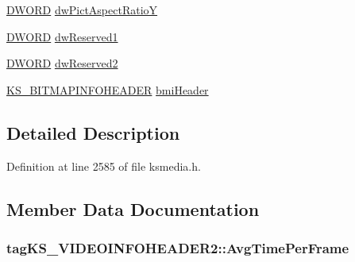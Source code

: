 \begin{DoxyCompactItemize}
\item 
\hyperlink{mapinls_8h_ad342ac907eb044443153a22f964bf0af}{D\+W\+O\+RD} \hyperlink{structtag_k_s___v_i_d_e_o_i_n_f_o_h_e_a_d_e_r2_a4ed8f4665121a30a954bf43a7d15a4b0}{dw\+Pict\+Aspect\+RatioY}
\item 
\hyperlink{mapinls_8h_ad342ac907eb044443153a22f964bf0af}{D\+W\+O\+RD} \hyperlink{structtag_k_s___v_i_d_e_o_i_n_f_o_h_e_a_d_e_r2_ad37c56ea4b08a9ea535d41892a46109e}{dw\+Reserved1}
\item 
\hyperlink{mapinls_8h_ad342ac907eb044443153a22f964bf0af}{D\+W\+O\+RD} \hyperlink{structtag_k_s___v_i_d_e_o_i_n_f_o_h_e_a_d_e_r2_adc01743deccf6bc808a6cfcd94d69abb}{dw\+Reserved2}
\item 
\hyperlink{ksmedia_8h_a6a2b96637a3edc2842d6edf85f090516}{K\+S\+\_\+\+B\+I\+T\+M\+A\+P\+I\+N\+F\+O\+H\+E\+A\+D\+ER} \hyperlink{structtag_k_s___v_i_d_e_o_i_n_f_o_h_e_a_d_e_r2_a5919b7e6342d10ed2bcb69ba49a5b6fb}{bmi\+Header}
\end{DoxyCompactItemize}


\subsection{Detailed Description}


Definition at line 2585 of file ksmedia.\+h.



\subsection{Member Data Documentation}
\subsubsection[{\texorpdfstring{Avg\+Time\+Per\+Frame}{AvgTimePerFrame}}]{ tag\+K\+S\+\_\+\+V\+I\+D\+E\+O\+I\+N\+F\+O\+H\+E\+A\+D\+E\+R2\+::\+Avg\+Time\+Per\+Frame}\hypertarget{structtag_k_s___v_i_d_e_o_i_n_f_o_h_e_a_d_e_r2_a89fece47a50e186aac85a270397a3af3}{}\label{structtag_k_s___v_i_d_e_o_i_n_f_o_h_e_a_d_e_r2_a89fece47a50e186aac85a270397a3af3}


